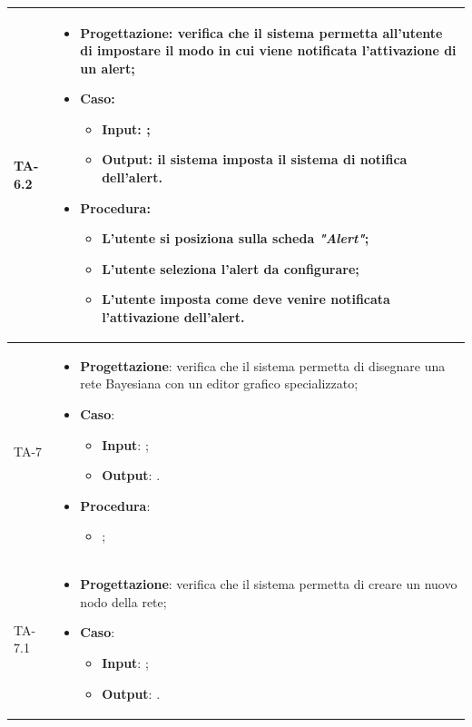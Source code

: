 \begin{longtable}{|C{2.5cm}|C{13cm}|}
\hline
{TA-6.2} &
\begin{itemize}
	\item \textbf{Progettazione}: verifica che il sistema permetta all'utente di impostare il modo in cui viene notificata l'attivazione di un alert;
	\item \textbf{Caso}: 
	\begin{itemize}
		\item \textbf{Input}: ;
		\item \textbf{Output}: il sistema imposta il sistema di notifica dell'alert.
	\end{itemize}
	\item \textbf{Procedura}:
	\begin{itemize}
		\item L'utente si posiziona sulla scheda \emph{"Alert"};
		\item L'utente seleziona l'alert da configurare;
		\item L'utente imposta come deve venire notificata l'attivazione dell'alert. 
	\end{itemize} 
\end{itemize} \\
\hline
{TA-7} &
\begin{itemize}
	\item \textbf{Progettazione}: verifica che il sistema permetta di disegnare una rete Bayesiana con un editor grafico specializzato;
	\item \textbf{Caso}: 
	\begin{itemize}
		\item \textbf{Input}: ;
		\item \textbf{Output}: .
	\end{itemize}
	\item \textbf{Procedura}:
	\begin{itemize}
		\item ;
	\end{itemize} 
\end{itemize} \\
\hline
{TA-7.1} &
\begin{itemize}
	\item \textbf{Progettazione}: verifica che il sistema permetta di creare un nuovo nodo della rete;
	\item \textbf{Caso}: 
	\begin{itemize}
		\item \textbf{Input}: ;
		\item \textbf{Output}: .
	\end{itemize}

\end{itemize}
\end{longtable}
